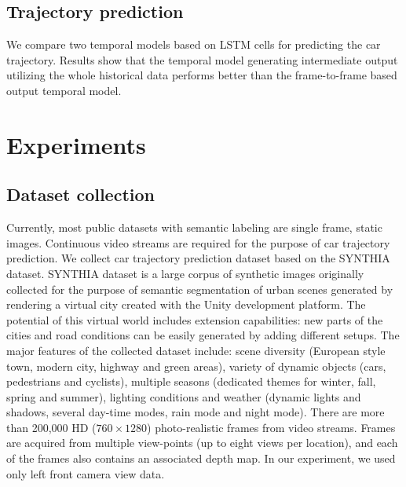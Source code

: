 \documentclass[10pt,twocolumn,letterpaper]{article}
\begin{document}
\subsection{Trajectory prediction}


We compare two temporal models based on LSTM cells for predicting the car trajectory.
Results show that the temporal model generating intermediate output utilizing the whole historical data performs better than the frame-to-frame based output temporal model.



\section{Experiments}

\subsection{Dataset collection}

Currently, most public datasets with semantic labeling are single frame, static images. Continuous video streams are required for the purpose of car trajectory prediction.
We collect car trajectory prediction dataset based on the SYNTHIA~\cite{ros2016synthia} dataset.
SYNTHIA dataset is a large corpus of synthetic images originally collected for the purpose of semantic segmentation of urban scenes generated by rendering a virtual city created with the Unity development platform.
The potential of this virtual world includes extension capabilities: new parts of the cities and road conditions can be easily generated by adding different setups. The major features of the collected dataset include: scene diversity (European style town, modern city, highway and green areas), variety of dynamic objects (cars, pedestrians and cyclists), multiple seasons (dedicated themes for winter, fall, spring and summer), lighting conditions and weather (dynamic lights and shadows, several day-time modes, rain mode and night mode).
There are more than 200,000 HD ($760\times1280$) photo-realistic frames from video streams.
Frames are acquired from multiple view-points (up to eight views per location), and each of the frames also contains an associated depth map. In our experiment, we used only left front camera view data.
\end{document}
